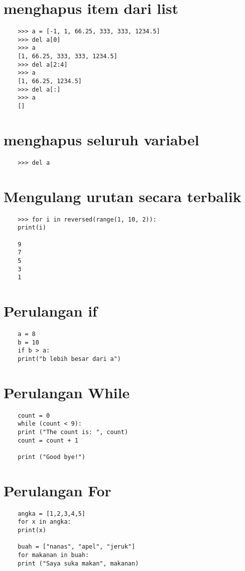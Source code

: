 \documentclass[12pt]{article} %
\begin{document}
\section{menghapus item dari list}
\begin{lstlisting}
	>>> a = [-1, 1, 66.25, 333, 333, 1234.5]
	>>> del a[0]
	>>> a
	[1, 66.25, 333, 333, 1234.5]
	>>> del a[2:4]
	>>> a
	[1, 66.25, 1234.5]
	>>> del a[:]
	>>> a
	[]
\end{lstlisting}

\section{menghapus seluruh variabel}
\begin{lstlisting}
	>>> del a
\end{lstlisting}

\section{Mengulang urutan secara terbalik}
\begin{lstlisting}
	>>> for i in reversed(range(1, 10, 2)):
	print(i)
	
	9
	7
	5
	3
	1
\end{lstlisting}

\section{Perulangan if}
\begin{lstlisting}
	a = 8
	b = 10
	if b > a:
	print("b lebih besar dari a")
\end{lstlisting}

\section{Perulangan While}
\begin{lstlisting}
	count = 0
	while (count < 9):
	print ("The count is: ", count)
	count = count + 1
	
	print ("Good bye!")
\end{lstlisting}

\section{Perulangan For}
\begin{lstlisting}
	angka = [1,2,3,4,5]
	for x in angka:
	print(x)
	
	buah = ["nanas", "apel", "jeruk"]
	for makanan in buah:
	print ("Saya suka makan", makanan)
\end{lstlisting}
\end{document}
